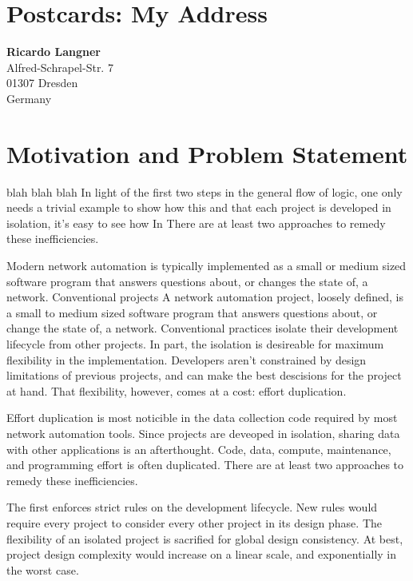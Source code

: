 \section{Postcards: My Address}
\label{sec:intro:address}

\textbf{Ricardo Langner} \\
Alfred-Schrapel-Str. 7 \\
01307 Dresden \\
Germany


\section{Motivation and Problem Statement}
\label{sec:intro:motivation}

blah blah blah
In light of the first two steps in the general flow of logic, one only needs a
trivial example to show how this and that each 
project is developed in isolation, it's easy to see how 
In 
There are at least two approaches to remedy these inefficiencies. 

Modern network automation is typically implemented as a small or medium sized
software program that answers questions about, or changes the state of, a 
network. Conventional projects 
A network automation project, loosely defined, is a small to medium sized 
software program that answers questions about, or change the state of, 
a network. Conventional practices isolate their development lifecycle
from other projects. In part, the isolation is desireable for maximum flexibility in the 
implementation. Developers aren't constrained by design limitations of previous
projects, and can make the best descisions for the project at hand. That 
flexibility, however, comes at a cost: effort duplication. 

Effort duplication is most noticible in the data collection code required 
by most network automation tools. Since projects are deveoped in isolation, 
sharing data with other applications is an afterthought. Code, data,
compute, maintenance, and programming effort is often duplicated. There are at least
two approaches to remedy these inefficiencies. 

The first enforces strict rules on the development lifecycle. New rules
would require every project to consider every other project in its design phase. 
The flexibility of an isolated project is sacrified for global design consistency.
At best, project design complexity would increase on a linear scale, and 
exponentially in the worst case.

